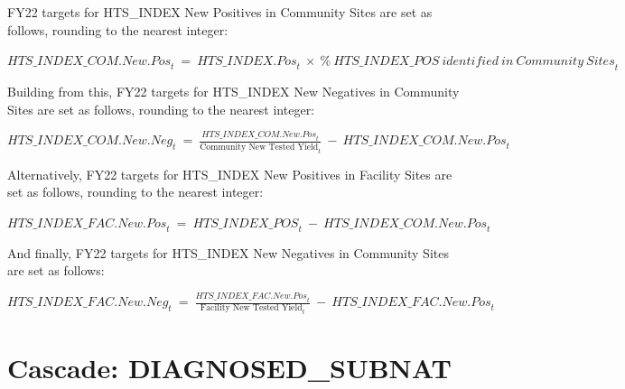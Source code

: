 \documentclass[
  openany]{book}
\begin{document}
FY22 targets for HTS\_INDEX New Positives in Community Sites are set as
follows, rounding to the nearest integer:

\begin{center} ${HTS\_ INDEX\_ COM.New.Pos}_{t}\  = \ {HTS\_ INDEX.Pos}_{t}\  \times \ {\%\ HTS\_ INDEX\_ POS\ identified\ in\ Community\ Sites}_{t}$ \end{center}

Building from this, FY22 targets for HTS\_INDEX New Negatives in
Community Sites are set as follows, rounding to the nearest integer:

\begin{center} ${HTS\_ INDEX\_ COM.New.Neg}_{t}\  = \ \frac{{HTS\_ INDEX\_ COM.New.Pos}_{t}}{\text{Community New Tested Yield}_{t}}\  - \ {HTS\_ INDEX\_ COM.New.Pos}_{t}$ \end{center}

Alternatively, FY22 targets for HTS\_INDEX New Positives in Facility
Sites are set as follows, rounding to the nearest integer:

\begin{center} ${HTS\_ INDEX\_ FAC.New.Pos}_{t}\  = \ {HTS\_ INDEX\_ POS}_{t}\  - \ {HTS\_ INDEX\_ COM.New.Pos}_{t}$ \end{center}

And finally, FY22 targets for HTS\_INDEX New Negatives in Community Sites
are set as follows:

\begin{center} ${HTS\_ INDEX\_ FAC.New.Neg}_{t}\  = \ \frac{{HTS\_ INDEX\_ FAC.New.Pos}_{t}}{\text{Facility New Tested Yield}_{t}}\  - \ {HTS\_ INDEX\_ FAC.New.Pos}_{t}$ \end{center}

\hypertarget{section}{%
\section{}\label{section}}

\hypertarget{cascade-diagnosed_subnat}{%
\section{Cascade: DIAGNOSED\_SUBNAT}\label{cascade-diagnosed_subnat}}
\end{document}
